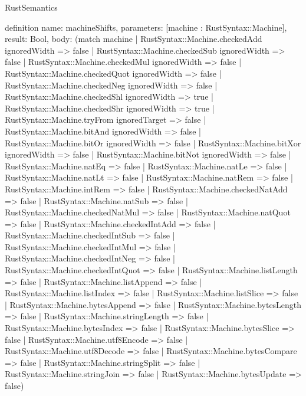 \begin{lexlean}{RustSemantics}
\begin{semanticmodule}
definition{
  name: machineShifts,
  parameters: [machine : RustSyntax::Machine],
  result: Bool,
  body: (match machine
    | RustSyntax::Machine.checkedAdd ignoredWidth => false
    | RustSyntax::Machine.checkedSub ignoredWidth => false
    | RustSyntax::Machine.checkedMul ignoredWidth => false
    | RustSyntax::Machine.checkedQuot ignoredWidth => false
    | RustSyntax::Machine.checkedNeg ignoredWidth => false
    | RustSyntax::Machine.checkedShl ignoredWidth => true
    | RustSyntax::Machine.checkedShr ignoredWidth => true
    | RustSyntax::Machine.tryFrom ignoredTarget => false
    | RustSyntax::Machine.bitAnd ignoredWidth => false
    | RustSyntax::Machine.bitOr ignoredWidth => false
    | RustSyntax::Machine.bitXor ignoredWidth => false
    | RustSyntax::Machine.bitNot ignoredWidth => false
    | RustSyntax::Machine.natEq => false
    | RustSyntax::Machine.natLe => false
    | RustSyntax::Machine.natLt => false
    | RustSyntax::Machine.natRem => false
    | RustSyntax::Machine.intRem => false
    | RustSyntax::Machine.checkedNatAdd => false
    | RustSyntax::Machine.natSub => false
    | RustSyntax::Machine.checkedNatMul => false
    | RustSyntax::Machine.natQuot => false
    | RustSyntax::Machine.checkedIntAdd => false
    | RustSyntax::Machine.checkedIntSub => false
    | RustSyntax::Machine.checkedIntMul => false
    | RustSyntax::Machine.checkedIntNeg => false
    | RustSyntax::Machine.checkedIntQuot => false
    | RustSyntax::Machine.listLength => false
    | RustSyntax::Machine.listAppend => false
    | RustSyntax::Machine.listIndex => false
    | RustSyntax::Machine.listSlice => false
    | RustSyntax::Machine.bytesAppend => false
    | RustSyntax::Machine.bytesLength => false
    | RustSyntax::Machine.stringLength => false
    | RustSyntax::Machine.bytesIndex => false
    | RustSyntax::Machine.bytesSlice => false
    | RustSyntax::Machine.utf8Encode => false
    | RustSyntax::Machine.utf8Decode => false
    | RustSyntax::Machine.bytesCompare => false
    | RustSyntax::Machine.stringSplit => false
    | RustSyntax::Machine.stringJoin => false
    | RustSyntax::Machine.bytesUpdate => false)
}


\end{semanticmodule}
\end{lexlean}
